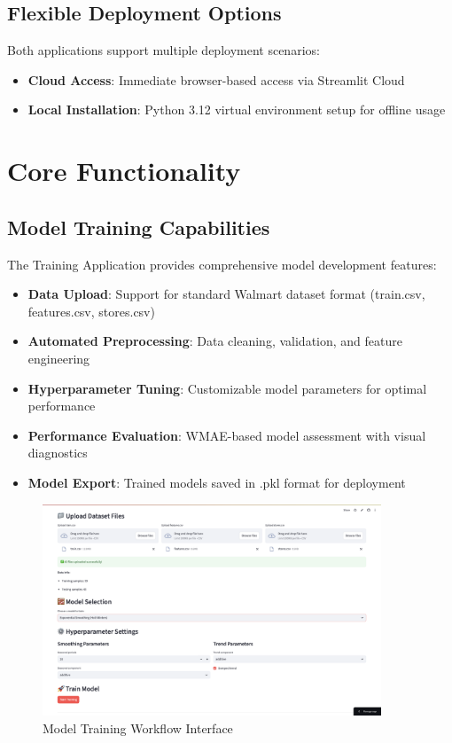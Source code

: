 \subsection{Flexible Deployment Options}

Both applications support multiple deployment scenarios:

\begin{itemize}
    \item \textbf{Cloud Access}: Immediate browser-based access via Streamlit Cloud
    \item \textbf{Local Installation}: Python 3.12 virtual environment setup for offline usage
\end{itemize}

\section{Core Functionality}

\subsection{Model Training Capabilities}

The Training Application provides comprehensive model development features:

\begin{itemize}
    \item \textbf{Data Upload}: Support for standard Walmart dataset format (train.csv, features.csv, stores.csv)
    \item \textbf{Automated Preprocessing}: Data cleaning, validation, and feature engineering
    \item \textbf{Hyperparameter Tuning}: Customizable model parameters for optimal performance
    \item \textbf{Performance Evaluation}: WMAE-based model assessment with visual diagnostics
    \item \textbf{Model Export}: Trained models saved in .pkl format for deployment
\end{itemize}

\begin{figure}[H]
    \centering
   \includegraphics[width=0.9\textwidth]{Images/01IntroductionAndMainFunction/TrainingWorkflow.png}
    \caption{Model Training Workflow Interface}
    \label{fig:training_workflow}
\end{figure}

